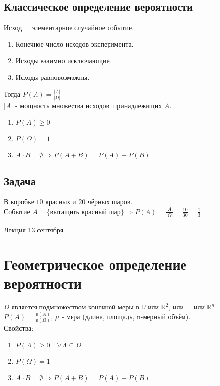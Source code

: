 \documentclass[12pt, a4paper]{article}
\begin{document}
    \subsection*{Классическое определение вероятности}
    Исход = элементарное случайное событие.
    \begin{enumerate}
        \item Конечное число исходов эксперимента.
        \item Исходы взаимно исключающие.
        \item Исходы равновозможны.
    \end{enumerate}
    Тогда $P(A) = \frac{|A|}{|\Omega|}$\\
    $|A|$ - мощность множества исходов, принадлежищих $A$.
    \begin{enumerate}
        \item $P(A) \geq 0$
        \item $P(\Omega) = 1$
        \item $A\cdot B = \emptyset\Rightarrow P(A + B) = P(A) + P(B)$
    \end{enumerate}
    \subsection*{Задача}
    В коробке $10$ красных и $20$ чёрных шаров.\\
    Событие $A = \{\text{вытащить красный шар}\}\Rightarrow P(A) = \frac{|A|}{|\Omega|} = \frac{10}{30} = \frac{1}{3}$
    \begin{center}
        Лекция 13 сентября.
    \end{center}
    \section*{Геометрическое определение вероятности}
    $\Omega$ является подмножеством конечной меры в $\mathbb{R}$ или $\mathbb{R}^2$, или ... или $\mathbb{R}^n$.
    $P(A) = \frac{\mu(A)}{\mu(\Omega)}$, $\mu$ - мера (длина, площадь, n-мерный объём).\\
    Свойства:
    \begin{enumerate}
        \item $P(A) \geq 0\quad \forall A\subseteq \Omega$
        \item $P(\Omega) = 1$
        \item $A\cdot B = \emptyset\Rightarrow P(A + B) = P(A) + P(B)$
    \end{enumerate}
\end{document}
